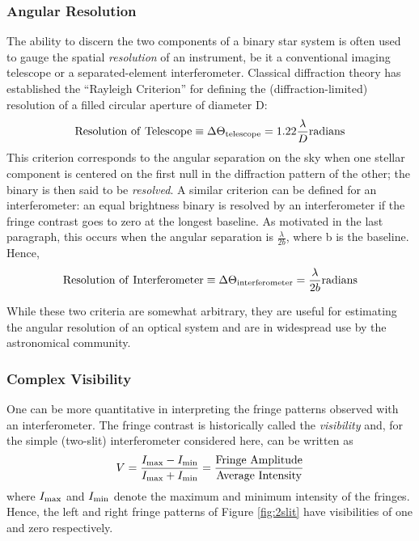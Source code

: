 \documentclass[12pt]{article}
\def\text{\rm}
\begin{document}
\subsubsection{Angular Resolution}
The ability to discern the two components of a binary star
system is often used to gauge the spatial {\em resolution} of an
instrument, be it a conventional imaging telescope or a
separated-element interferometer.  Classical diffraction theory has
established the ``Rayleigh Criterion'' for defining the
(diffraction-limited) resolution of a filled circular aperture of
diameter D:
\begin{equation}
 {\text{Resolution~of~Telescope}}  \equiv  \Delta\Theta_{\text{telescope}} 
 =  1.22 \frac{\lambda}{D} 
{\text{ radians}} 
\end{equation}
This criterion corresponds to the angular separation on the sky when
one stellar component is centered on the first null in the diffraction
pattern of the other; the binary is then said to be {\em resolved}.  A
similar criterion can be defined for an interferometer: an
equal brightness binary is resolved by an interferometer 
if the fringe contrast goes to zero at the longest baseline.
As motivated in the last paragraph,
this occurs when the angular separation is $\frac{\lambda}{2b}$, where
b is the baseline.  Hence,
\begin{equation}
 {\text{Resolution~of~Interferometer}}  \equiv  \Delta\Theta_{\text{interferometer}} 
 =  \frac{\lambda}{2b} 
{\text{ radians}} 
\end{equation}

While these two criteria are somewhat arbitrary, they are useful for
estimating the angular resolution of an optical system and are in
widespread use by the astronomical community.


\subsubsection{Complex Visibility}
\label{section:zernike1}
One can be more quantitative in interpreting the fringe
patterns observed with an interferometer.
The fringe contrast is historically called the
{\em visibility} and, for the simple (two-slit) interferometer considered here,
can be written as  
\begin{equation}
V = \frac{I_{\text{max}} - I_{\text{min}}}
{I_{\text{max}} + I_{\text{min}}}
  =  \frac{{\rm Fringe~Amplitude}}{{\rm Average~ Intensity}}
\end{equation}
where $I_{\text{max}}$ and $I_{\text{min}}$ denote the maximum and
minimum intensity of the fringes.  Hence, the left and right fringe
patterns of Figure \ref{fig:2slit} have visibilities of one and zero
respectively. 
\end{document}
